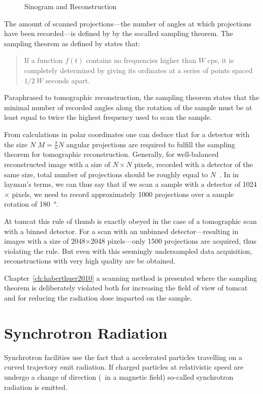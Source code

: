 \begin{figure}
{		\label{subfig:sin}%
		}%
	\caption{Sinogram and Reconstruction}
	\label{fig:Sin Rec}
\end{figure}

The amount of scanned projections---the number of angles at which projections have been recorded---is defined by by the socalled sampling theorem. The sampling theorem as defined by \citet{Shannon1949} states that: \begin{quote} If a function $f(t)$ contains no frequencies higher than $W$ cps, it is completely determined by giving its ordinates at a series of points spaced $1/2\ W$ seconds apart. \cite{Shannon1949}\end{quote}

Paraphrased to tomographic reconstruction, the sampling theorem states that the minimal number of recorded angles along the rotation of the sample must be at least equal to twice the highest frequency used to scan the sample.

From calculations in polar coordinates one can deduce that for a detector with the size $N$ $M=\frac{\pi}{n}N$ angular projections are required to fulfill the sampling theorem for tomographic reconstruction. Generally, for well-balanced reconstructed image with a size of $N\times N$ pixels, recorded with a detector of the same size, total number of projections should be roughly equal to $N$~\cite{Kak2002}. In in layman's terms, we can thus say that if we scan a sample with a detector of 1024$\times$ pixels, we need to record approximately 1000 projections over a sample rotation of \SI{180}{\degree}.

At \ac{tomcat} this rule of thumb is exactly obeyed in the case of a tomographic scan with a binned detector. For a scan with an unbinned detector---resulting in images with a size of 2048$\times$2048 pixels---only 1500 projections are acquired, thus violating the rule. But even with this seemingly undersampled data acquisition, reconstructions with very high quality are be obtained.

Chapter~\ref{ch:haberthuer2010} a scanning method is presented where the sampling theorem is deliberately violated both for increasing the field of view of \ac{tomcat} and for reducing the radiation dose imparted on the sample.

\section{Synchrotron Radiation}
Synchrotron facilities use the fact that a accelerated particles travelling on a curved trajectory emit radiation. If charged particles at relativistic speed are undergo a change of direction (\ie\ in a magnetic field) so-called synchrotron radiation is emitted. 

